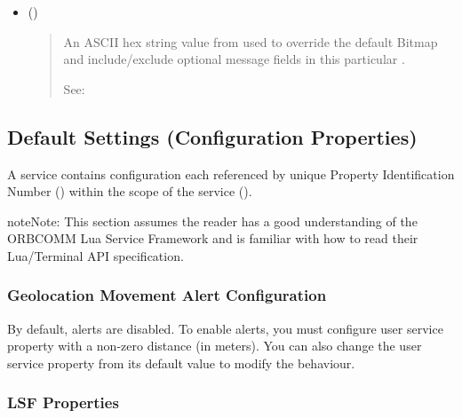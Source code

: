 \documentclass[letterpaper,10pt,english]{sphinxmanual}
\begin{document}
\begin{itemize}
\item {} 
 ()
\begin{quote}

An ASCII hex string value from  used to override the default Bitmap and include/exclude optional message fields in this particular .

See: {\hyperref[\detokenize{configuration:msgbitmap}]{}}
\end{quote}

\end{itemize}


\subsection{Default Settings (Configuration Properties)}
\label{\detokenize{configuration:default-settings-configuration-properties}}
A  service contains configuration  each referenced by unique Property Identification Number () within the scope of the service ().

\begin{sphinxadmonition}{note}{Note:}
This section assumes the reader has a good understanding of the ORBCOMM Lua Service Framework and is familiar with how to read their Lua/Terminal API specification.
\end{sphinxadmonition}


\subsubsection{Geolocation Movement Alert Configuration}
\label{\detokenize{configuration:geolocation-movement-alert-configuration}}\label{\detokenize{configuration:geolocation-config}}
By default,  alerts are disabled.  To enable  alerts, you must configure user service property  with a non-zero distance (in meters).
You can also change the user service property  from its default value to modify the  behaviour.


\subsubsection{LSF Properties}
\label{\detokenize{configuration:lsf-properties}}
\end{document}
